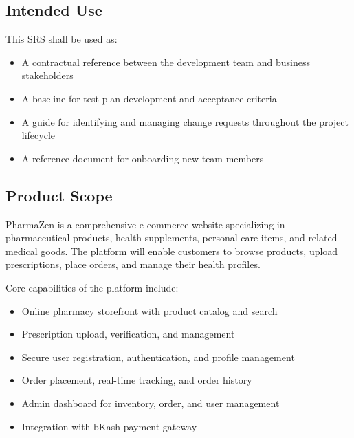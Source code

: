 \documentclass[12pt, a4paper]{article}
\begin{document}
\subsection{Intended Use}

This SRS shall be used as:

\begin{itemize}[leftmargin=1.5em, itemsep=4pt]
  \item A contractual reference between the development team and business stakeholders
  \item A baseline for test plan development and acceptance criteria
  \item A guide for identifying and managing change requests throughout the project lifecycle
  \item A reference document for onboarding new team members
\end{itemize}

\subsection{Product Scope}

PharmaZen is a comprehensive e-commerce website specializing in pharmaceutical products, health supplements, personal care items, and related medical goods. The platform will enable customers to browse products, upload prescriptions, place orders, and manage their health profiles.

Core capabilities of the platform include:

\begin{itemize}[leftmargin=1.5em, itemsep=4pt]
  \item Online pharmacy storefront with product catalog and search
  \item Prescription upload, verification, and management
  \item Secure user registration, authentication, and profile management
  \item Order placement, real-time tracking, and order history
  \item Admin dashboard for inventory, order, and user management
  \item Integration with bKash payment gateway
\end{itemize}

\end{document}
